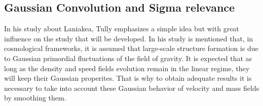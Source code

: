 \documentclass[usenatbib]{mnras}
\begin{document}
\subsection{Gaussian Convolution and Sigma relevance}

In his study about Laniakea, Tully\cite{tully_laniakea_2014} emphasizes a simple idea but with great influence on the study that will be developed. In his study is mentioned that, in cosmological frameworks, it is assumed that large-scale structure formation is due to Gaussian primordial fluctuations of the field of gravity. It is expected that as long as the density and speed fields evolution remain in the linear regime, they will keep their Gaussian properites. That is why to obtain adequate results it is necessary to take into account these Gaussian behavior of velocity and mass fields by smoothing them.
\end{document}
